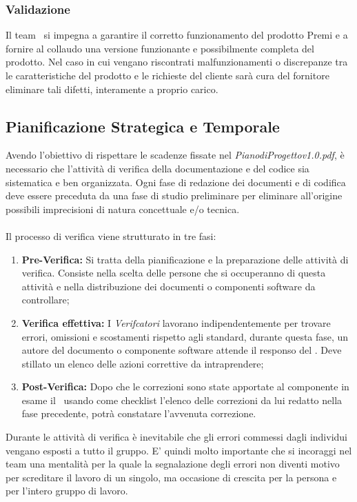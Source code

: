\subsubsection{Validazione}
Il team \gruppo\ si impegna a garantire il corretto funzionamento del prodotto Premi e a fornire al collaudo una versione funzionante e possibilmente completa del prodotto. Nel caso in cui vengano riscontrati malfunzionamenti o discrepanze tra le caratteristiche del prodotto e le richieste del cliente sarà cura del fornitore eliminare tali difetti, interamente a proprio carico.

\subsection{Pianificazione Strategica e Temporale}
Avendo l'obiettivo di rispettare le scadenze fissate nel \textit{PianodiProgettov1.0.pdf}, è necessario che l'attività di verifica della documentazione e del codice sia sistematica e ben organizzata. Ogni fase di redazione dei documenti e di codifica deve essere preceduta da una fase di studio preliminare per eliminare all'origine possibili imprecisioni di natura concettuale e/o tecnica.
\\ \\Il processo di verifica viene strutturato in tre fasi:
\begin{enumerate}
	\item \textbf{Pre-Verifica:} Si tratta della pianificazione e la preparazione delle attività di verifica. Consiste nella scelta delle persone che si occuperanno di questa attività e nella distribuzione dei documenti o componenti software da controllare;
    \item \textbf{Verifica effettiva:} I \textit{Verifcatori} lavorano indipendentemente per trovare errori, omissioni e scostamenti rispetto agli standard, durante questa fase, un autore del documento o componente software attende il responso del \ruoloVerificatore. Deve stillato un elenco delle azioni correttive da intraprendere;
    \item \textbf{Post-Verifica:} Dopo che le correzioni sono state apportate al componente in esame il \ruoloVerificatore\, usando  come checklist l'elenco delle correzioni da lui redatto nella fase precedente, potrà constatare l'avvenuta correzione.
\end{enumerate}
Durante le attività di verifica è inevitabile che gli errori commessi dagli individui vengano esposti a tutto il gruppo. E' quindi molto importante che si incoraggi nel team una mentalità per la quale la segnalazione degli errori non diventi motivo per screditare il lavoro di un singolo, ma occasione di crescita per la persona e per l'intero gruppo di lavoro.

